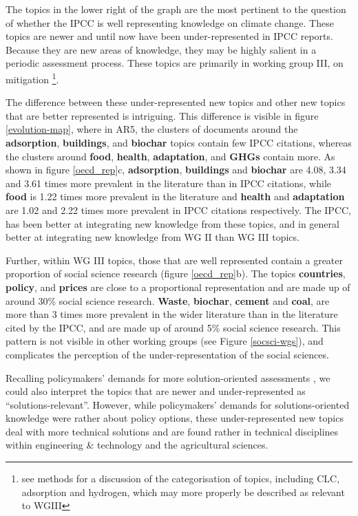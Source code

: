 \documentclass{article}
\begin{document}
\begin{linenumbers}
		The topics in the lower right of the graph are the most pertinent to the question of whether the IPCC is well representing knowledge on climate change. These topics are newer and until now have been under-represented in IPCC reports. Because they are new areas of knowledge, they may be highly salient in a periodic assessment process. These topics are primarily in working group III, on mitigation \footnote{see methods for a discussion of the categorisation of topics, including CLC, adsorption and hydrogen, which may more properly be described as relevant to WGIII}.
		
		
		The difference between these under-represented new topics and other new topics that are better represented is intriguing. This difference is visible in figure \ref{evolution-map}, where in AR5, the clusters of documents around the \textbf{adsorption}, \textbf{buildings}, and \textbf{biochar} topics contain few IPCC citations, whereas the clusters around \textbf{food}, \textbf{health}, \textbf{adaptation}, and \textbf{GHGs} contain more. As shown in figure \ref{oecd_rep}c, \textbf{adsorption}, \textbf{buildings} and \textbf{biochar} are 4.08, 3.34 and 3.61 times more prevalent in the literature than in IPCC citations, while \textbf{food} is 1.22 times more prevalent in the literature and \textbf{health} and \textbf{adaptation} are 1.02 and 2.22 times more prevalent in IPCC citations respectively. The IPCC, has been better at integrating new knowledge from these topics, and in general better at integrating new knowledge from WG II than WG III topics.
		
		Further, within WG III topics, those that are well represented contain a greater proportion of social science research (figure \ref{oecd_rep}b). The topics \textbf{countries}, \textbf{policy}, and \textbf{prices} are close to a proportional representation and are made up of around 30\% social science research. \textbf{Waste}, \textbf{biochar}, \textbf{cement} and \textbf{coal}, are more than 3 times more prevalent in the wider literature than in the literature cited by the IPCC, and are made up of around 5\% social science research. This pattern is not visible in other working groups (see Figure \ref{socsci-wgs}), and complicates the perception of the under-representation of the social sciences.
		
		
		Recalling policymakers' demands for more solution-oriented assessments \cite{Kowarsch2017}, we could also interpret the topics that are newer and under-represented as ``solutions-relevant''. However, while policymakers' demands for solutions-oriented knowledge were rather about policy options, these under-represented new topics deal with more technical solutions and are found rather in technical disciplines within engineering \& technology and the agricultural sciences.
		

\end{linenumbers}
\end{document}
